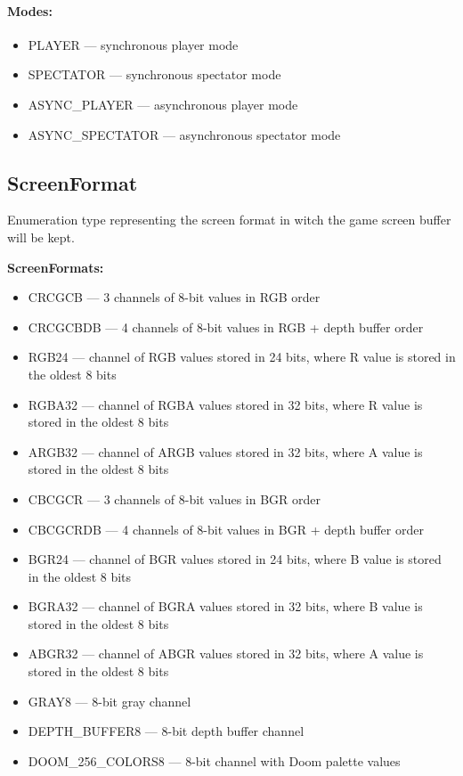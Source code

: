 \paragraph{Modes:}

\begin{itemize}
	\item PLAYER --- synchronous player mode
	\item SPECTATOR --- synchronous spectator mode
	\item ASYNC\_PLAYER --- asynchronous player mode
	\item ASYNC\_SPECTATOR --- asynchronous spectator mode 
\end{itemize}

\subsection{ScreenFormat}\label{subsec:screenformat}
	Enumeration type representing the screen format in witch the game screen buffer will be kept. 


\vspace{20pt}
\textbf{ScreenFormats:}
\begin{itemize}
 \item CRCGCB --- 3 channels of 8-bit values in RGB order
 \item CRCGCBDB --- 4 channels of 8-bit values in RGB + depth buffer order
 \item RGB24 --- channel of RGB values stored in 24 bits, where R value is stored in the oldest 8 bits
 \item RGBA32 --- channel of RGBA values stored in 32 bits, where R value is stored in the oldest 8 bits
 \item ARGB32 --- channel of ARGB values stored in 32 bits, where A value is stored in the oldest 8 bits
 \item CBCGCR --- 3 channels of 8-bit values in BGR order
 \item CBCGCRDB --- 4 channels of 8-bit values in BGR + depth buffer order
 \item BGR24 --- channel of BGR values stored in 24 bits, where B value is stored in the oldest 8 bits
 \item BGRA32 --- channel of BGRA values stored in 32 bits, where B value is stored in the oldest 8 bits 
 \item ABGR32 --- channel of ABGR values stored in 32 bits, where A value is stored in the oldest 8 bits
 \item GRAY8 --- 8-bit gray channel
 \item DEPTH\_BUFFER8 --- 8-bit depth buffer channel
 \item DOOM\_256\_COLORS8 --- 8-bit channel with Doom palette values
\end{itemize}
